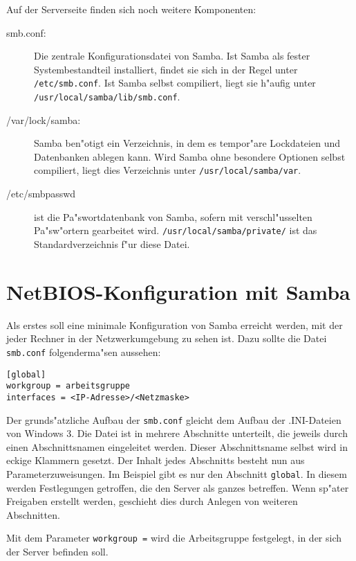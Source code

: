 \documentclass{scrartcl}
\newcommand{\param}{\texttt}
\newcommand{\datei}{\texttt}
\begin{document}
Auf der Serverseite finden sich noch weitere Komponenten:

\begin{description}
  
\item[smb.conf:] Die zentrale Konfigurationsdatei von Samba. Ist Samba
  als fester Systembestandteil installiert, findet sie sich in der
  Regel unter \datei{/etc/smb.conf}. Ist Samba selbst compiliert,
  liegt sie h"aufig unter \datei{/usr/local/samba/lib/smb.conf}.
  
\item[/var/lock/samba:] Samba ben"otigt ein Verzeichnis, in dem es
  tempor"are Lockdateien und Datenbanken ablegen kann. Wird Samba ohne
  besondere Optionen selbst compiliert, liegt dies Verzeichnis unter
  \datei{/usr/local/samba/var}.
  
\item[/etc/smbpasswd] ist die Pa"swortdatenbank von Samba, sofern mit
  verschl"usselten Pa"s\-w"ortern gearbeitet wird.
  \datei{/usr/local/samba/private/} ist das Standardverzeichnis f"ur
  diese Datei.

\end{description}

\section{NetBIOS-Konfiguration mit Samba}

Als erstes soll eine minimale Konfiguration von Samba erreicht werden,
mit der jeder Rechner in der Netzwerkumgebung zu sehen ist. Dazu
sollte die Datei \datei{smb.conf} folgenderma"sen aussehen:

\begin{verbatim}
[global]
workgroup = arbeitsgruppe
interfaces = <IP-Adresse>/<Netzmaske>
\end{verbatim}

\label{aufbau-smb.conf}
Der grunds"atzliche Aufbau der \datei{smb.conf} gleicht dem Aufbau der
.INI-Dateien von Windows 3. Die Datei ist in mehrere Abschnitte
unterteilt, die jeweils durch einen Abschnittsnamen eingeleitet
werden. Dieser Abschnittsname selbst wird in eckige Klammern gesetzt.
Der Inhalt jedes Abschnitts besteht nun aus Parameterzuweisungen. Im
Beispiel gibt es nur den Abschnitt \param{global}. In diesem werden
Festlegungen getroffen, die den Server als ganzes betreffen. Wenn
sp"ater Freigaben erstellt werden, geschieht dies durch Anlegen von
weiteren Abschnitten.

Mit dem Parameter \param{workgroup =} wird die Arbeitsgruppe
festgelegt, in der sich der Server befinden soll.
\end{document}
